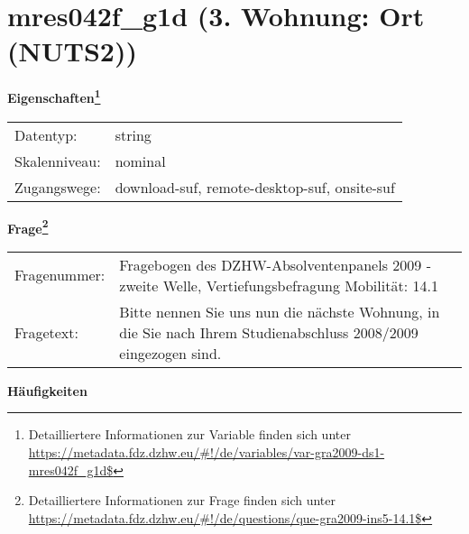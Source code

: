 
    \setcounter{footnote}{0}

    \vspace*{-1.8cm}
	\section{mres042f\_g1d (3. Wohnung: Ort (NUTS2))}
	\label{section:mres042f_g1d}



    \vspace*{0.5cm}
    \noindent\textbf{Eigenschaften\footnote{Detailliertere Informationen zur Variable finden sich unter
		\url{https://metadata.fdz.dzhw.eu/\#!/de/variables/var-gra2009-ds1-mres042f_g1d$}}}\\
	\begin{tabularx}{\hsize}{@{}lX}
	Datentyp: & string \\
	Skalenniveau: & nominal \\
	Zugangswege: &
	  download-suf, 
	  remote-desktop-suf, 
	  onsite-suf
 \\
    \end{tabularx}



				\vspace*{0.5cm}
                \noindent\textbf{Frage\footnote{Detailliertere Informationen zur Frage finden sich unter
		              \url{https://metadata.fdz.dzhw.eu/\#!/de/questions/que-gra2009-ins5-14.1$}}}\\
				\begin{tabularx}{\hsize}{@{}lX}
					Fragenummer: &
					  Fragebogen des DZHW-Absolventenpanels 2009 - zweite Welle, Vertiefungsbefragung Mobilität:
					  14.1
 \\
					Fragetext: & Bitte nennen Sie uns nun die nächste Wohnung, in die Sie nach Ihrem Studienabschluss 2008/2009 eingezogen sind. \\
				\end{tabularx}





        		\vspace*{0.5cm}
                \noindent\textbf{Häufigkeiten}

